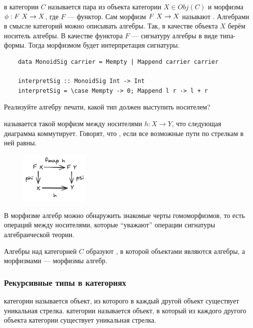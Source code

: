  в категории $C$ называется пара из объекта категории $X \in Obj(C)$ и морфизма $\phi : F~ X \to X$, где $F$ --- функтор.
Сам морфизм $F~ X \to X$ называют .
Алгебрами в смысле категорий можно описывать алгебры.
Так, в качестве объекта $X$ берём носитель алгебры.
В качестве функтора $F$ --- сигнатуру алгебры в виде типа-формы.
Тогда морфизмом будет интерпретация сигнатуры.
\begin{verbatim}
    data MonoidSig carrier = Mempty | Mappend carrier carrier

    interpretSig :: MonoidSig Int -> Int
    interpretSig = \case Mempty -> 0; Mappend l r -> l + r
\end{verbatim}

\begin{task}
    Реализуйте алгебру печати, какой тип должен выступить носителем?
\end{task}

 называется такой морфизм между носителями $h : X \to Y$, что следующая диаграмма коммутирует.
Говорят, что , если все возможные пути по стрелкам в ней равны.
\begin{figure}[h!]
    \centering
    \includegraphics[width=0.3\textwidth]{figs/alg-homomorphism}
\end{figure}

В морфизме алгебр можно обнаружить знакомые черты гомоморфизмов, то есть операций между носителями, которые ``уважают'' операции сигнатуры алгебраической теории.

Алгебры над категорией $C$ образуют , в которой объектами являются алгебры, а морфизмами --- морфизмы алгебр.

\subsubsection{Рекурсивные типы в категориях}

 категории называется объект, из которого в каждый другой объект существует уникальная стрелка.
 категории называется объект, в который из каждого другого объекта категории существует уникальная стрелка.


